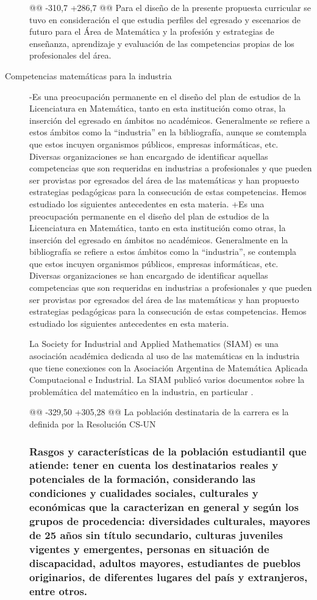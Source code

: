 \begin{description}
@@ -310,7 +286,7 @@ Para el diseño de la presente propuesta curricular se tuvo en consideración el
 que estudia perfiles del egresado y escenarios de futuro para el Área de Matemática y la profesión y estrategias de enseñanza, aprendizaje y evaluación de las competencias propias de los profesionales del área. 
 
 \item[Competencias matemáticas para la industria] 
-Es una preocupación permanente en el diseño del plan de estudios de la Licenciatura en Matemática, tanto en esta institución como otras, la inserción del egresado en ámbitos no académicos. Generalmente se refiere a estos ámbitos como la ``industria'' en la bibliografía, aunque se comtempla que estos incuyen organismos públicos, empresas informáticas, etc. Diversas organizaciones se han encargado de identificar aquellas competencias que son requeridas en industrias a profesionales y que pueden ser provistas por egresados del área de las matemáticas y han propuesto estrategias pedagógicas para la consecución de estas competencias. Hemos estudiado los siguientes antecedentes en esta materia.
+Es una preocupación permanente en el diseño del plan de estudios de la Licenciatura en Matemática, tanto en esta institución como otras, la inserción del egresado en ámbitos no académicos. Generalmente  en la bibliografía se refiere a estos ámbitos como la ``industria'',  se contempla que estos incuyen organismos públicos, empresas informáticas, etc. Diversas organizaciones se han encargado de identificar aquellas competencias que son requeridas en industrias a profesionales y que pueden ser provistas por egresados del área de las matemáticas y han propuesto estrategias pedagógicas para la consecución de estas competencias. Hemos estudiado los siguientes antecedentes en esta materia.
 
 La Society for Industrial and Applied Mathematics (SIAM)  es una asociación académica dedicada al uso de las matemáticas en la industria que tiene conexiones con la Asociación Argentina de Matemática Aplicada Computacional e Industrial. La SIAM publicó varios documentos sobre la problemática del matemático en la industria, en particular \cite{society1996siam,society2012siam}.
 
@@ -329,50 +305,28 @@ La población destinataria de la carrera es la definida por la Resolución CS-UN
 
 \subsubsection{Rasgos y características de la población estudiantil que atiende: tener en cuenta los destinatarios reales y potenciales de la formación, considerando las condiciones y cualidades sociales, culturales y económicas que la caracterizan en general y según los grupos de procedencia: diversidades culturales, mayores de 25 años sin título secundario, culturas juveniles vigentes y emergentes, personas en situación de discapacidad, adultos mayores, estudiantes de pueblos originarios, de diferentes lugares del país y extranjeros, entre otros.}
 

\end{description}
